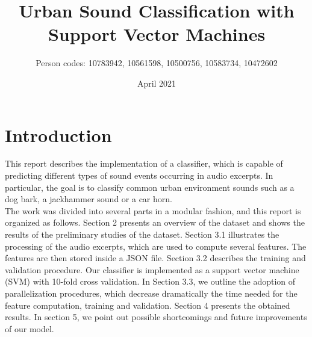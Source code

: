 \documentclass{article}
\title{\textbf{Urban Sound Classification with Support Vector Machines}}
\author{Person codes: 10783942, 10561598, 10500756, 10583734, 10472602}
\date{April 2021}
\begin{document}
\maketitle

\section{Introduction}
This report describes the implementation of a classifier, which is capable of predicting different types of sound events occurring in audio excerpts. In particular, the goal is to classify common urban environment sounds such as a dog bark, a jackhammer sound or a car horn.\\
The work was divided into several parts in a modular fashion, and this report is organized as follows. Section 2 presents an overview of the dataset and shows the results of the preliminary studies of the dataset. Section 3.1 illustrates the processing of the audio excerpts, which are used to compute several features. The features are then stored inside a JSON file. Section 3.2 describes the training and validation procedure. Our classifier is implemented as a support vector machine (SVM) with 10-fold cross validation. In Section 3.3, we outline the adoption of parallelization procedures, which decrease dramatically the time needed for the feature computation, training and validation. Section 4 presents the obtained results. In section 5, we point out possible shortcomings and future improvements of our model. 
\end{document}
